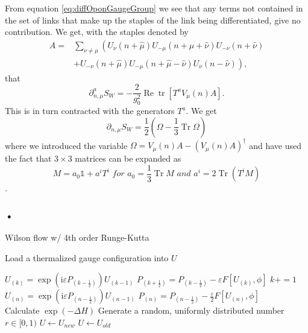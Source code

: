 \documentclass[a4paper,10pt]{article}
\begin{document}
From equation \eqref{eq:diffOponGaugeGroup} we see that any terms not contained in the set of links that make up the staples of the link being differentiated, give no contribution. We get, with the staples denoted by
\begin{equation}\label{eq:sumOfStaples}
\begin{aligned}
A=&\sum_{\nu \neq \mu}\left(U_{\nu}(n+\hat{\mu}) U_{-\mu}(n+\hat{\mu}+\hat{\nu}) U_{-\nu}(n+\hat{\nu})\right.\\
&\left.+U_{-\nu}(n+\hat{\mu}) U_{-\mu}(n+\hat{\mu}-\hat{\nu}) U_{\nu}(n-\hat{\nu})\right),
\end{aligned}
\end{equation}
that 
\begin{equation}
\partial_{n, \mu}^{a}S_W = -\frac{2}{g_0^{2}}\operatorname{Re} \operatorname{tr}\left[ T^aV_\mu(n)A \right].
\end{equation}
This is in turn contracted with the generators $T^a$. We get
\begin{equation}
\partial_{n, \mu}S_W =\frac{1}{2}\left( \Omega -\frac{1}{3}\operatorname{Tr}\Omega  \right) 
\end{equation}
where we introduced the variable $\Omega = V_\mu(n)A - \left( V_\mu(n)A \right)^\dagger$ and have used the fact that $3\times 3$ matrices can be expanded as
\begin{equation}
M = a_0\mathbb{1}+a^iT^i\,\,for\,\,a_0=\frac{1}{3}\operatorname{Tr}M\,\,and\,\,a^i = 2\operatorname{Tr}\left( T^iM \right)  
\end{equation}
\cite{borodulin1995core}.
\subsubsection{•}
\begin{algorithm}[H]
\caption{Wilson flow w/ 4th order Runge-Kutta}\label{alg:Wilson_flow}
\begin{algorithmic}
\Ensure
\State Load a thermalized gauge configuration into $U$

\State $U_{(k)}=\exp \left(\mathrm{i} \varepsilon P_{\left(k-\frac{1}{2}\right)}\right) U_{(k-1)}$
\State $P_{\left(k+\frac{1}{2}\right)}=P_{\left(k-\frac{1}{2}\right)}-\varepsilon F\left[ U_{(k)},\phi \right]$
\State $ k+=1$
\EndWhile
\State $U_{(n)}=\exp \left(\mathrm{i} \varepsilon P_{\left(n-\frac{1}{2}\right)}\right) U_{(n-1)}$
\State $P_{\left(n\right)}=P_{\left(n-\frac{1}{2}\right)}-\frac{\varepsilon}{2} F\left[ U_{(n)},\phi \right]$\\
\State Calculate $\exp (-\Delta H)$
\State Generate a random, uniformly distributed number $r \in [0,1) $
    \State $U \gets U_{new}$
\Else
    \State $U \gets U_{old}$
\EndIf

\end{algorithmic}
\end{algorithm}
\end{document}
